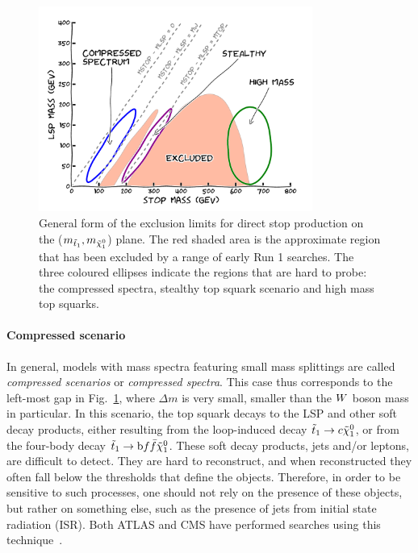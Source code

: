 \begin{figure}[tpb]
  \centering
  \includegraphics[width=0.8\textwidth]{figures/razor_motivation/story_boost_motivation}
  \caption{General form of the exclusion limits for direct stop production on the
($m_{\tilde{t}_1},m_{\tilde{\chi}_1^0}$) plane. The red shaded area is the approximate region that has been
excluded by a range of early Run 1 searches. The three coloured ellipses indicate the regions that
are hard to probe: the compressed spectra, stealthy top squark scenario and high mass top squarks.
  \label{fig:boost_story_motivation}}
\end{figure}

\paragraph{Compressed scenario}
In general, models with mass spectra featuring small mass splittings are called \textit{compressed
scenarios} or \textit{compressed spectra}. This case thus corresponds to the left-most gap in
Fig.~\ref{fig:boost_story_motivation}, where $\Delta m$ is very small, smaller than the $W$ boson
mass in particular. 
In this scenario, the top squark decays to the LSP and other soft decay products, either resulting
from the loop-induced decay $\tilde{t}_1 \rightarrow c \tilde{\chi}_1^0$, or from the four-body decay $\tilde{t}_1
\rightarrow \mathrm{b} f \bar{f} \tilde{\chi}_1^0$. These soft decay products, jets and/or leptons, are difficult to
detect. They are hard to reconstruct, and when reconstructed they often fall below the \pt
thresholds that define the objects. 
Therefore, in order to be sensitive to such processes, one should not rely on the presence of
these objects, but rather on something else, such as the presence of jets from initial state
radiation (ISR). Both ATLAS and CMS have performed searches using this
technique~\cite{CMS-PAS-SUS-13-009,Aad:2014nra}. 

